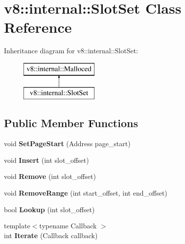 \hypertarget{classv8_1_1internal_1_1_slot_set}{}\section{v8\+:\+:internal\+:\+:Slot\+Set Class Reference}
\label{classv8_1_1internal_1_1_slot_set}
Inheritance diagram for v8\+:\+:internal\+:\+:Slot\+Set\+:\begin{figure}[H]
\begin{center}
\leavevmode
\includegraphics[height=2.000000cm]{classv8_1_1internal_1_1_slot_set}
\end{center}
\end{figure}
\subsection*{Public Member Functions}
\begin{DoxyCompactItemize}
\item 
void {\bfseries Set\+Page\+Start} (Address page\+\_\+start)\hypertarget{classv8_1_1internal_1_1_slot_set_a3991eba2add7cf9153acbe6a5f23a4bb}{}\label{classv8_1_1internal_1_1_slot_set_a3991eba2add7cf9153acbe6a5f23a4bb}

\item 
void {\bfseries Insert} (int slot\+\_\+offset)\hypertarget{classv8_1_1internal_1_1_slot_set_af6d1fb778d7d7bc74080f8cd86b6f8f2}{}\label{classv8_1_1internal_1_1_slot_set_af6d1fb778d7d7bc74080f8cd86b6f8f2}

\item 
void {\bfseries Remove} (int slot\+\_\+offset)\hypertarget{classv8_1_1internal_1_1_slot_set_a980b7dfc0d0145ff484d72763729a76b}{}\label{classv8_1_1internal_1_1_slot_set_a980b7dfc0d0145ff484d72763729a76b}

\item 
void {\bfseries Remove\+Range} (int start\+\_\+offset, int end\+\_\+offset)\hypertarget{classv8_1_1internal_1_1_slot_set_a72d9677bab364dd78eda747d8e10a4ab}{}\label{classv8_1_1internal_1_1_slot_set_a72d9677bab364dd78eda747d8e10a4ab}

\item 
bool {\bfseries Lookup} (int slot\+\_\+offset)\hypertarget{classv8_1_1internal_1_1_slot_set_a986636bf33efe2283031b903afd04148}{}\label{classv8_1_1internal_1_1_slot_set_a986636bf33efe2283031b903afd04148}

\item 
{\footnotesize template$<$typename Callback $>$ }\\int {\bfseries Iterate} (Callback callback)\hypertarget{classv8_1_1internal_1_1_slot_set_ade451d6149a5d5b48ba82f0b78f0aafb}{}\label{classv8_1_1internal_1_1_slot_set_ade451d6149a5d5b48ba82f0b78f0aafb}

\end{DoxyCompactItemize}
